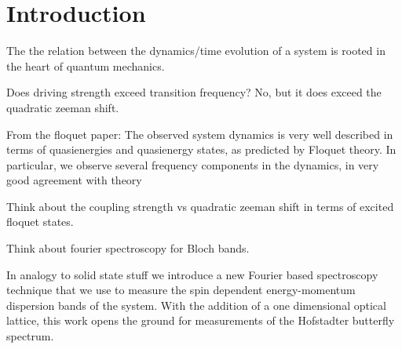 \section{Introduction}



The the relation between the dynamics/time evolution of a system is rooted in the heart of quantum mechanics. 

Does driving strength exceed transition frequency? No, but it does exceed the quadratic zeeman shift. 

From the floquet paper: The observed  system dynamics is very well described in terms of
quasienergies and quasienergy states, as predicted by
Floquet theory. In particular, we observe several frequency
components in the dynamics, in very good agreement with
theory

Think about the coupling strength vs quadratic zeeman shift in terms of excited floquet states. 

Think about fourier spectroscopy for Bloch bands.

In analogy to solid state stuff we introduce a new Fourier based spectroscopy technique that we use to measure the spin dependent energy-momentum dispersion bands of the system. With the addition of a one dimensional optical lattice, this work opens the ground for measurements of the Hofstadter butterfly spectrum. 


